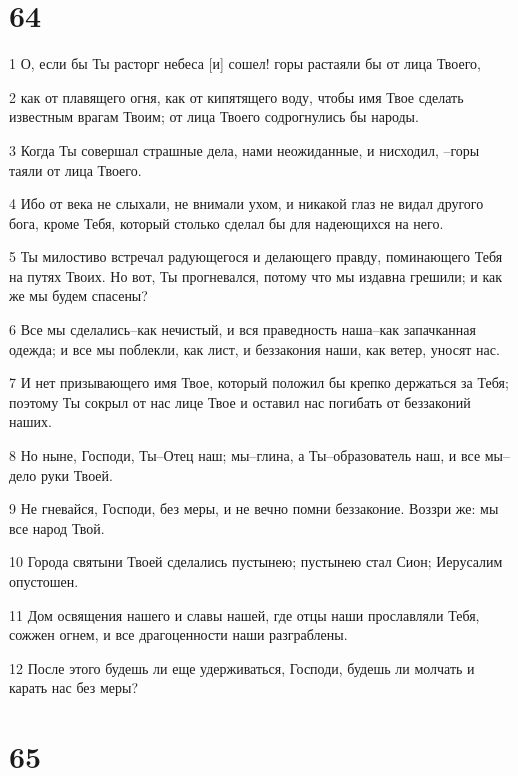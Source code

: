 \chapter{64}

\par 1 О, если бы Ты расторг небеса [и] сошел! горы растаяли бы от лица Твоего,
\par 2 как от плавящего огня, как от кипятящего воду, чтобы имя Твое сделать известным врагам Твоим; от лица Твоего содрогнулись бы народы.
\par 3 Когда Ты совершал страшные дела, нами неожиданные, и нисходил, --горы таяли от лица Твоего.
\par 4 Ибо от века не слыхали, не внимали ухом, и никакой глаз не видал другого бога, кроме Тебя, который столько сделал бы для надеющихся на него.
\par 5 Ты милостиво встречал радующегося и делающего правду, поминающего Тебя на путях Твоих. Но вот, Ты прогневался, потому что мы издавна грешили; и как же мы будем спасены?
\par 6 Все мы сделались--как нечистый, и вся праведность наша--как запачканная одежда; и все мы поблекли, как лист, и беззакония наши, как ветер, уносят нас.
\par 7 И нет призывающего имя Твое, который положил бы крепко держаться за Тебя; поэтому Ты сокрыл от нас лице Твое и оставил нас погибать от беззаконий наших.
\par 8 Но ныне, Господи, Ты--Отец наш; мы--глина, а Ты--образователь наш, и все мы--дело руки Твоей.
\par 9 Не гневайся, Господи, без меры, и не вечно помни беззаконие. Воззри же: мы все народ Твой.
\par 10 Города святыни Твоей сделались пустынею; пустынею стал Сион; Иерусалим опустошен.
\par 11 Дом освящения нашего и славы нашей, где отцы наши прославляли Тебя, сожжен огнем, и все драгоценности наши разграблены.
\par 12 После этого будешь ли еще удерживаться, Господи, будешь ли молчать и карать нас без меры?

\chapter{65}

